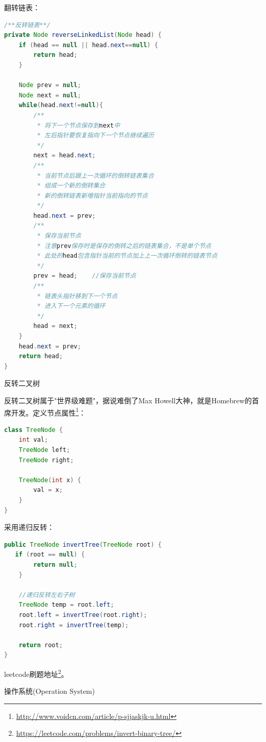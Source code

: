\documentclass[8pt]{book}
\makeatletter
\numberwithin{dummy}{section}
\theoremstyle{ocrenumbox}
\theoremstyle{blacknumex}
\theoremstyle{blacknumbox}
\theoremstyle{ocrenum}
\renewcommand{\section}{\@startsection{section}{1}{\z@}
	{-4ex \@plus -1ex \@minus -.4ex}
	{1ex \@plus.2ex }
	{\normalfont\large\sffamily\bfseries}}
\renewcommand{\subsection}{\@startsection {subsection}{2}{\z@}
	{-3ex \@plus -0.1ex \@minus -.4ex}
	{0.5ex \@plus.2ex }
	{\normalfont\sffamily\bfseries}}
\makeatother
\begin{document}
翻转链表：

\begin{lstlisting}[language=Java]
/**反转链表**/
private Node reverseLinkedList(Node head) {
    if (head == null || head.next==null) {
        return head;
    }

    Node prev = null;
    Node next = null;
    while(head.next!=null){
        /**
         * 将下一个节点保存到next中
         * 左后指针要恢复指向下一个节点继续遍历
         */
        next = head.next;
        /**
         * 当前节点后跟上一次循环的倒转链表集合
         * 组成一个新的倒转集合
         * 新的倒转链表新增指针当前指向的节点
         */
        head.next = prev;
        /**
         * 保存当前节点
         * 注意prev保存时是保存的倒转之后的链表集合，不是单个节点
         * 此处的head包含指针当前的节点加上上一次循环倒转的链表节点
         */
        prev = head;    //保存当前节点
        /**
         * 链表头指针移到下一个节点
         * 进入下一个元素的循环
         */
        head = next;
    }
    head.next = prev;
    return head;
}
\end{lstlisting}

\subsection{反转二叉树}

反转二叉树属于"世界级难题"，据说难倒了Max Howell大神，就是Homebrew的首席开发。定义节点属性\footnote{\url{http://www.voidcn.com/article/p-sjjaskjk-u.html}}：

\begin{lstlisting}[language=Java]
class TreeNode {
    int val;
    TreeNode left;
    TreeNode right;

    TreeNode(int x) {
        val = x;
    }
}
\end{lstlisting}

采用递归反转：

\begin{lstlisting}[language=Java]
public TreeNode invertTree(TreeNode root) {
   if (root == null) {
        return null;
    }

    //递归反转左右子树
    TreeNode temp = root.left;
    root.left = invertTree(root.right);
    root.right = invertTree(temp);

    return root; 
}
\end{lstlisting}

leetcode刷题地址\footnote{\url{https://leetcode.com/problems/invert-binary-tree/}}。


\section{操作系统(Operation System)}
\end{document}
